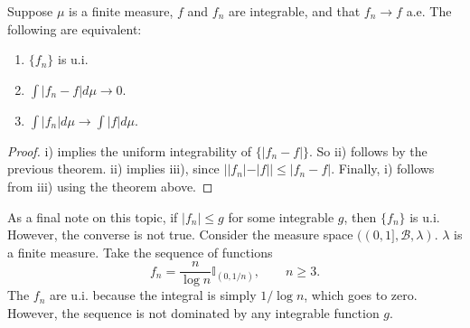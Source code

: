 \documentclass[11pt,fleqn]{book} %
\begin{document}
\begin{theorem} \label{thm:ui-equivalence}
	Suppose $\mu$ is a finite measure, $f$ and $f_n$ are integrable, and that $f_n \to f$ a.e. The following are equivalent:
	\begin{enumerate}[label=\roman*)]
		\item $\{f_n\}$ is u.i.
		\item $\int |f_n-f| d\mu \to 0$.
		\item $\int |f_n| d\mu \to \int |f| d\mu$.
	\end{enumerate}
\end{theorem}

\begin{proof}
	i) implies the uniform integrability of $\{|f_n-f|\}$. So ii) follows by the previous theorem. ii) implies iii), since $||f_n|-|f|| \leq |f_n - f|$. Finally, i) follows from iii) using the theorem above.
\end{proof}

As a final note on this topic, if $|f_n| \leq g$ for some integrable $g$, then $\{f_n\}$ is u.i. However, the converse is not true. Consider the measure space $((0,1],\mathcal{B},\lambda)$. $\lambda$ is a finite measure. Take the sequence of functions
\[
	f_n = \frac{n}{\log n} \mathbb{I}_{(0,1/n)}, \qquad n \geq 3.
\]
The $f_n$ are u.i. because the integral is simply $1/\log n$, which goes to zero. However, the sequence is not dominated by any integrable function $g$.





\cleardoublepage
{}
\setlength{\columnsep}{0.75cm}
\printindex

\end{document}
